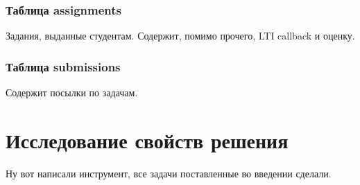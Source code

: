 \documentclass[a4paper,article,14pt]{extarticle}
\begin{document}
\subsubsection{Таблица assignments}

Задания, выданные студентам. Содержит, помимо прочего, LTI callback и оценку.

\subsubsection{Таблица submissions}

Содержит посылки по задачам.

\section{Исследование свойств решения}


Ну вот написали инструмент, все задачи поставленные во введении сделали.

\begin{thebibliography}{1}
\end{thebibliography}
\end{document}
